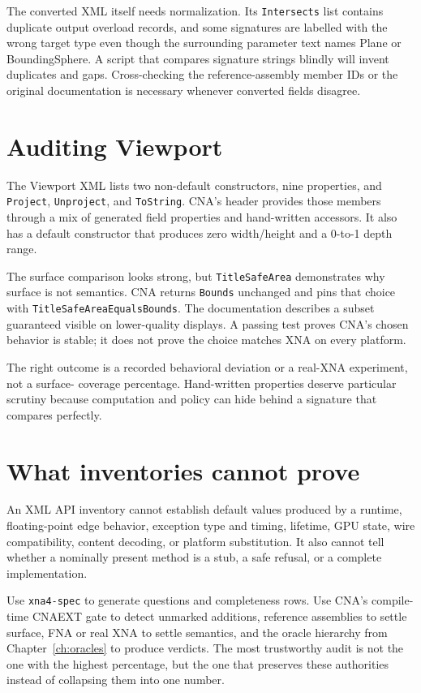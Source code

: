 The converted XML itself needs normalization.  Its \texttt{Intersects} list contains duplicate
output overload records, and some signatures are labelled with the wrong target type even though
the surrounding parameter text names Plane or BoundingSphere.  A script that compares signature
strings blindly will invent duplicates and gaps.  Cross-checking the reference-assembly member IDs
or the original documentation is necessary whenever converted fields disagree.

\section{Auditing Viewport}

The Viewport XML lists two non-default constructors, nine properties, and
\texttt{Project}, \texttt{Unproject}, and \texttt{ToString}.  CNA's header provides those members
through a mix of generated field properties and hand-written accessors.  It also has a default
constructor that produces zero width/height and a 0-to-1 depth range.

The surface comparison looks strong, but \texttt{TitleSafeArea} demonstrates why surface is not
semantics.  CNA returns \texttt{Bounds} unchanged and pins that choice with
\texttt{TitleSafeAreaEqualsBounds}.  The documentation describes a subset guaranteed visible on
lower-quality displays.  A passing test proves CNA's chosen behavior is stable; it does not prove
the choice matches XNA on every platform.

The right outcome is a recorded behavioral deviation or a real-XNA experiment, not a surface-
coverage percentage.  Hand-written properties deserve particular scrutiny because computation and
policy can hide behind a signature that compares perfectly.

\section{What inventories cannot prove}

An XML API inventory cannot establish default values produced by a runtime, floating-point edge
behavior, exception type and timing, lifetime, GPU state, wire compatibility, content decoding, or
platform substitution.  It also cannot tell whether a nominally present method is a stub, a safe
refusal, or a complete implementation.

Use \texttt{xna4-spec} to generate questions and completeness rows.  Use CNA's compile-time CNAEXT
gate to detect unmarked additions, reference assemblies to settle surface, FNA or real XNA to
settle semantics, and the oracle hierarchy from Chapter~\ref{ch:oracles} to produce verdicts.  The
most trustworthy audit is not the one with the highest percentage, but the one that preserves
these authorities instead of collapsing them into one number.
